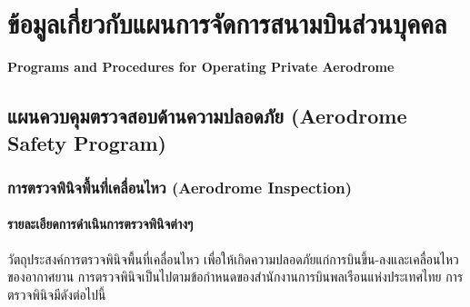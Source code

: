 
\chapter{ข้อมูลเกี่ยวกับแผนการจัดการสนามบินส่วนบุคคล}


\textbf{Programs and Procedures for Operating Private Aerodrome}

\section{แผนควบคุมตรวจสอบด้านความปลอดภัย (Aerodrome Safety Program)}

\subsection{การตรวจพินิจพื้นที่เคลื่อนไหว (Aerodrome Inspection)}

\subsubsection{รายละเอียดการดำเนินการตรวจพินิจต่างๆ} \label{รายละเอียดการดำเนินการตรวจพินิจต่างๆ}

วัตถุประสงค์การตรวจพินิจพื้นที่เคลื่อนไหว เพื่อให้เกิดความปลอดภัยแก่การบินขึ้น-ลงและเคลื่อนไหวของอากาศยาน การตรวจพินิจเป็นไปตามข้อกำหนดของสำนักงานการบินพลเรือนแห่งประเทศไทย การตรวจพินิจมีดังต่อไปนี้

